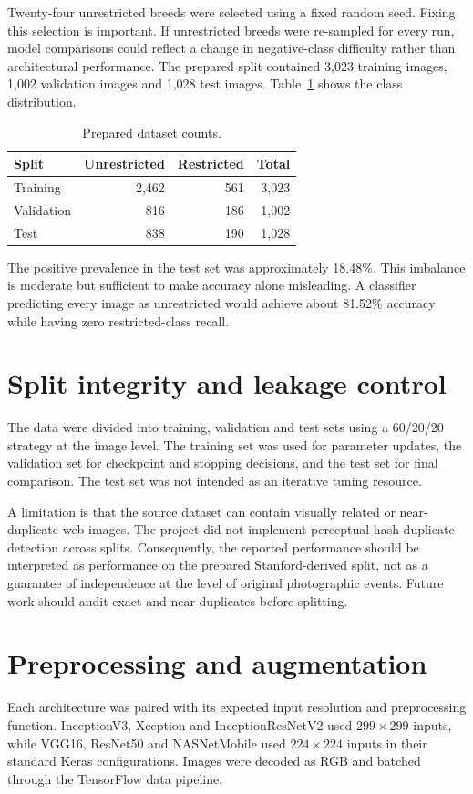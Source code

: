 Twenty-four unrestricted breeds were selected using a fixed random seed. Fixing this selection is important. If unrestricted breeds were re-sampled for every run, model comparisons could reflect a change in negative-class difficulty rather than architectural performance. The prepared split contained 3,023 training images, 1,002 validation images and 1,028 test images. Table~\ref{tab:datasetcounts} shows the class distribution.

\begin{table}[H]
\centering
\caption{Prepared dataset counts.}
\label{tab:datasetcounts}
\renewcommand{\arraystretch}{1.6}
\begin{tabular}{lrrr}
\toprule
Split & Unrestricted & Restricted & Total \\
\midrule
Training & 2,462 & 561 & 3,023 \\
Validation & 816 & 186 & 1,002 \\
Test & 838 & 190 & 1,028 \\
\bottomrule
\end{tabular}
\end{table}

The positive prevalence in the test set was approximately 18.48\%. This imbalance is moderate but sufficient to make accuracy alone misleading. A classifier predicting every image as unrestricted would achieve about 81.52\% accuracy while having zero restricted-class recall.

\section{Split integrity and leakage control}
The data were divided into training, validation and test sets using a 60/20/20 strategy at the image level. The training set was used for parameter updates, the validation set for checkpoint and stopping decisions, and the test set for final comparison. The test set was not intended as an iterative tuning resource.

A limitation is that the source dataset can contain visually related or near-duplicate web images. The project did not implement perceptual-hash duplicate detection across splits. Consequently, the reported performance should be interpreted as performance on the prepared Stanford-derived split, not as a guarantee of independence at the level of original photographic events. Future work should audit exact and near duplicates before splitting.

\section{Preprocessing and augmentation}
Each architecture was paired with its expected input resolution and preprocessing function. InceptionV3, Xception and InceptionResNetV2 used $299\times299$ inputs, while VGG16, ResNet50 and NASNetMobile used $224\times224$ inputs in their standard Keras configurations. Images were decoded as RGB and batched through the TensorFlow data pipeline.

